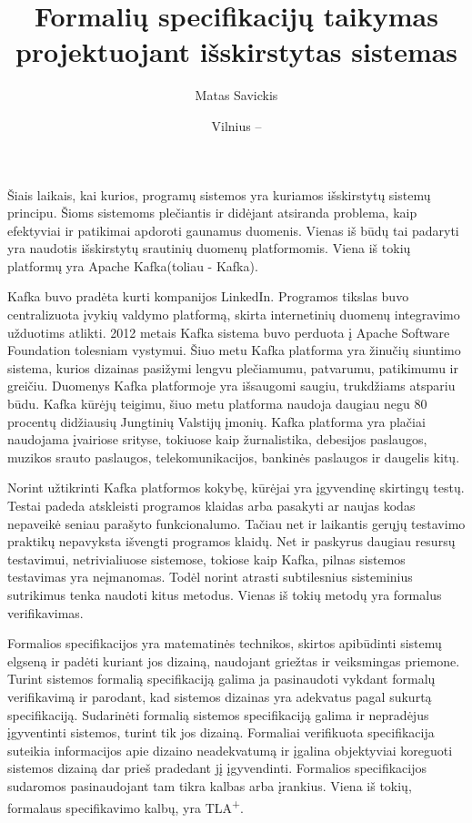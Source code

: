\documentclass{VUMIFPSmagistrinis}
\title{Formalių specifikacijų taikymas projektuojant išskirstytas sistemas}
\author{Matas Savickis}
\date{Vilnius – \the\year}
\begin{document}
\maketitle

\tableofcontents


		Šiais laikais, kai kurios, programų sistemos yra kuriamos išskirstytų sistemų principu\cite{mcr}.
		Šioms sistemoms plečiantis ir didėjant atsiranda problema, kaip efektyviai ir patikimai apdoroti gaunamus duomenis\cite{bucchiarone2018monolithic}.
		Vienas iš būdų tai padaryti yra naudotis išskirstytų srautinių duomenų platformomis.
		Viena iš tokių platformų yra Apache Kafka(toliau - Kafka)\cite{kfk}.


 		Kafka buvo pradėta kurti kompanijos LinkedIn\cite{kfk}. Programos tikslas buvo centralizuota įvykių valdymo platformą, skirta internetinių duomenų integravimo užduotims atlikti.
		2012 metais Kafka sistema buvo perduota į Apache Software Foundation tolesniam vystymui.
		Šiuo metu Kafka platforma yra žinučių siuntimo sistema, kurios dizainas pasižymi lengvu plečiamumu, patvarumu, patikimumu ir greičiu.
		Duomenys Kafka platformoje yra išsaugomi saugiu, trukdžiams atspariu būdu.
		Kafka kūrėjų teigimu, šiuo metu platforma naudoja daugiau negu 80 procentų didžiausių Jungtinių Valstijų įmonių\cite{kfk}.
		Kafka platforma yra plačiai naudojama įvairiose srityse, tokiuose kaip žurnalistika, debesijos paslaugos, muzikos srauto paslaugos, telekomunikacijos, bankinės paslaugos ir daugelis kitų\cite{kfk}.


		Norint užtikrinti Kafka platformos kokybę, kūrėjai yra įgyvendinę skirtingų testų\cite{kfkGH}.
		Testai padeda atskleisti programos klaidas arba pasakyti ar naujas kodas nepaveikė seniau parašyto funkcionalumo\cite{819971}.
		Tačiau net ir laikantis gerųjų testavimo praktikų nepavyksta išvengti programos klaidų.
		Net ir paskyrus daugiau resursų testavimui, netrivialiuose sistemose, tokiose kaip Kafka, pilnas sistemos testavimas yra neįmanomas\cite{sullivan2004software}.
		Todėl norint atrasti subtilesnius sisteminius sutrikimus tenka naudoti kitus metodus.
		Vienas iš tokių metodų yra formalus verifikavimas.


		Formalios specifikacijos yra matematinės technikos, skirtos apibūdinti sistemų elgseną ir padėti kuriant jos dizainą, naudojant griežtas ir veiksmingas priemone\cite{holzmann1995improvement}.
		Turint sistemos formalią specifikaciją galima ja pasinaudoti vykdant formalų verifikavimą ir parodant, kad sistemos dizainas yra adekvatus pagal sukurtą specifikaciją.
		Sudarinėti formalią sistemos specifikaciją galima ir nepradėjus įgyventinti sistemos, turint tik jos dizainą. 
		Formaliai verifikuota specifikacija suteikia informacijos apie dizaino neadekvatumą ir įgalina objektyviai koreguoti sistemos dizainą dar prieš pradedant jį įgyvendinti.
		Formalios specifikacijos sudaromos pasinaudojant tam tikra kalbas arba įrankius.
		Viena iš tokių, formalaus specifikavimo kalbų, yra TLA\textsuperscript{+}.
		
\end{document}
